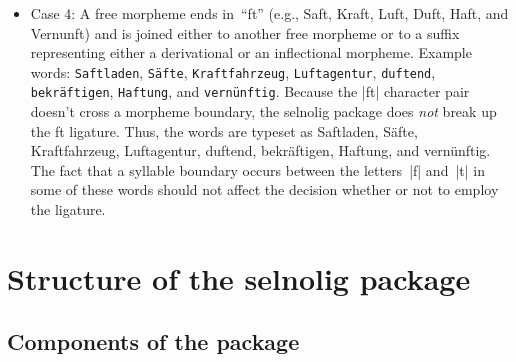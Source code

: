 \documentclass[11pt]{article}
\newcommand{\pkg}[1]{\textsf{#1}}
\newcommand{\opt}[1]{\texttt{#1}}
\begin{document}
\begin{itemize}
\begin{itemize}
\begin{itemize}
\item It would also seem OK to use the ft-ligature in expressions such as \enquote{zu fünft} and \enquote{die zwölftschnells\kern0pt te Sprinterin Bayerns}: even though the |t| character represents a derivational morpheme, the ligature occurs at \emph{end} of the word or word fragment. In the case of the word \enquote{zwölftschnells\breaklig te}, the argument for keeping the ft ligature is based on the observation that the entire fragment \enquote{zwölft} serves a prefix to \enquote{schnells\kern0pt te}. 

In contrast, the ft-ligature should \emph{not} be used in \enquote{Beethoven's Fünfte Sinfonie} and \enquote{zum elften Mal}. Observe that the argument in favor of breaking up the ft-ligature in the words \enquote{Fünfte} and \enquote{elften} is \emph{not} related to the fact that the words happen to have two syllables and that the syllables are divided between the letters~|f| and~|t|.

\end{itemize}

\item Case 4: A free morpheme ends in~\enquote{ft} (e.g., Saft, Kraft, Luft, Duft, Haft, and Vernunft) and is joined either to another free morpheme or to a suffix representing either a derivational or an inflectional morpheme. Example words: \opt{Saftladen}, \opt{Säfte}, \opt{Kraftfahrzeug}, \opt{Luftagentur}, \opt{duftend}, \opt{bekräftigen}, \opt{Haftung}, and \opt{ver\-nünftig}. Because the |ft| character pair doesn't cross a morpheme boundary, the \pkg{selnolig} package does \emph{not} break up the ft ligature. Thus, the words are typeset as Saftladen, Säfte, Kraftfahrzeug, Luftagentur, duftend, bekräftigen, Haftung, and ver\-nünftig. The fact that a syllable boundary occurs between the letters~|f| and~|t| in some of these words should not affect the decision whether or not to employ the ligature.

\end{itemize}
\end{itemize}


\section[Structure of the selnolig package]{Structure of the \pkg{selnolig} package}

\subsection{Components of the package}
\end{document}

